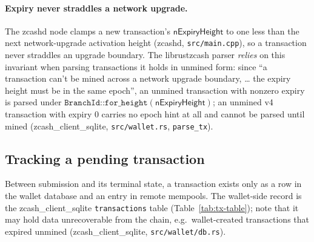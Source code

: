 \documentclass[11pt,a4paper]{article}
\theoremstyle{definition}
\begin{document}
\paragraph{Expiry never straddles a network upgrade.} The \textsf{zcashd}
node clamps a new transaction's $\mathsf{nExpiryHeight}$ to one less than the
next network-upgrade activation height (\textsf{zcashd},
\texttt{src/main.cpp}), so a transaction never straddles an upgrade
boundary. The \textsf{librustzcash} parser \emph{relies} on this invariant
when parsing
transactions it holds in unmined form: since ``a transaction can't be mined
across a network upgrade boundary, \ldots{} the expiry height must be in
the same epoch'', an unmined transaction with nonzero expiry is parsed
under $\texttt{BranchId::for\_height}(\mathsf{nExpiryHeight})$; an unmined
v4 transaction with expiry $0$ carries no epoch hint at all and cannot be
parsed until mined (\textsf{zcash\_client\_sqlite}, \texttt{src/wallet.rs},
\texttt{parse\_tx}).

\subsection{Tracking a pending transaction}\label{sec:lifecycle-tracking}

Between submission and its terminal state, a transaction exists only as a
row in the wallet database and an entry in remote mempools. The wallet-side
record is the \textsf{zcash\_client\_sqlite} \texttt{transactions} table
(Table~\ref{tab:tx-table}); note that it may hold data unrecoverable from
the chain, e.g.\ wallet-created transactions that expired unmined
(\textsf{zcash\_client\_sqlite}, \texttt{src/wallet/db.rs}).
\end{document}
